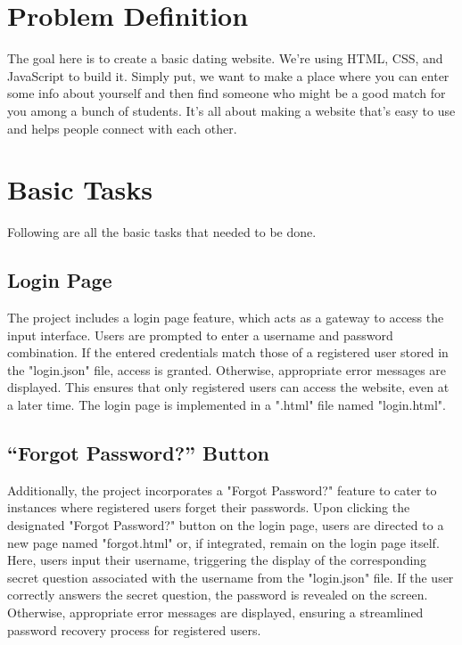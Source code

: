 \documentclass[12pt,a4paper]{article}
\begin{document}





\tableofcontents


\newpage
{} %

\section{Problem Definition}

The goal here is to create a basic dating website. We're using HTML, CSS, and JavaScript to build it. Simply put, we want to make a place where you can enter some info about yourself and then find someone who might be a good match for you among a bunch of students. It's all about making a website that's easy to use and helps people connect with each other.

\section{Basic Tasks}
Following are all the basic tasks that needed to be done.
\subsection{Login Page}
The project includes a login page feature, which acts as a gateway to access the input interface. Users are prompted to enter a username and password combination. If the entered credentials match those of a registered user stored in the "login.json" file, access is granted. Otherwise, appropriate error messages are displayed. This ensures that only registered users can access the website, even at a later time. The login page is implemented in a ".html" file named "login.html".
\subsection{“Forgot Password?” Button}
Additionally, the project incorporates a "Forgot Password?" feature to cater to instances where registered users forget their passwords. Upon clicking the designated "Forgot Password?" button on the login page, users are directed to a new page named "forgot.html" or, if integrated, remain on the login page itself. Here, users input their username, triggering the display of the corresponding secret question associated with the username from the "login.json" file. If the user correctly answers the secret question, the password is revealed on the screen. Otherwise, appropriate error messages are displayed, ensuring a streamlined password recovery process for registered users.
\end{document}

